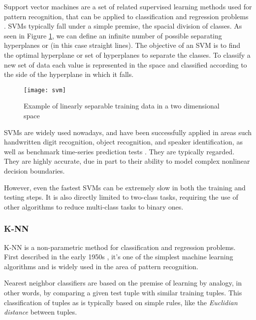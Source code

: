 Support vector machines are a set of related supervised learning methods used
for pattern recognition, that can be applied to classification and regression
problems \cite{Cortes1995}. SVMs typically fall under a simple premise, the
spacial division of classes. As seen in Figure \ref{fig:svm}, we can define an
infinite number of possible separating hyperplanes or 
(in this case straight lines). The objective of an SVM is to find the optimal
hyperplane or set of hyperplanes to separate the classes. To classify a new set
of data each value is represented in the space and classified according to the
side of the hyperplane in which it falls.

\begin{figure}[!htb]
  \begin{center}
    \leavevmode
    \texttt{[image: svm]}
    \caption[Example of linearly separable training data in a two dimensional
    space]{Example of linearly separable training data in a two dimensional
    space \cite{han2006data}}
    \label{fig:svm}
  \end{center}
\end{figure}

SVMs are widely used nowadays, and have been successfully applied in areas such
handwritten digit recognition, object recognition, and speaker identification,
as well as benchmark time-series prediction tests \cite{han2006data}. They are
typically regarded. They are highly accurate, due in part to their ability to
model complex nonlinear decision boundaries.

However, even the fastest SVMs can be extremely slow in both the training and
testing steps. It is also directly limited to two-class tasks, requiring the use
of other algorithms to reduce multi-class tasks to binary ones.

\subsubsection*{K-NN}

K-NN is a non-parametric method for classification and regression problems.
First described in the early 1950s \cite{han2006data}, it's one of the simplest
machine learning algorithms and is widely used in the area of pattern
recognition.

Nearest neighbor classifiers are based on the premise of learning by analogy, in
other words, by comparing a given test tuple with similar training tuples. This
classification of tuples as  is typically based on simple rules,
like the \textit{Euclidian distance} between tuples.


